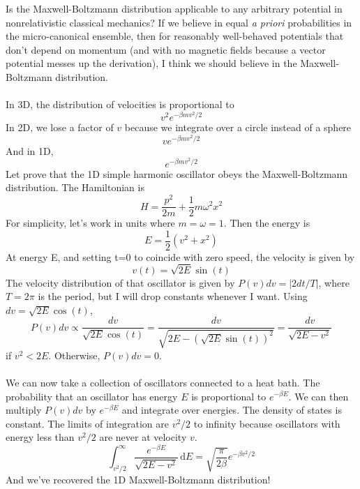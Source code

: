 \documentclass[a4paper,12pt]{article}
\begin{document}

Is the Maxwell-Boltzmann distribution applicable to any arbitrary potential in nonrelativistic classical mechanics?  If we believe in equal {\it a priori} probabilities in the micro-canonical ensemble, then for reasonably well-behaved potentials that don't depend on momentum (and with no magnetic fields because a vector potential messes up the derivation), I think we should believe in the Maxwell-Boltzmann distribution.
\\  \\
In 3D, the distribution of velocities is proportional to
\begin{equation}
v^2 e^{-\beta m v^2/2}
\end{equation}
In 2D, we lose a factor of $v$ because we integrate over a circle instead of a sphere\begin{equation}
v e^{-\beta m v^2/2}
\end{equation}
And in 1D,
\begin{equation}
e^{-\beta m v^2/2}
\end{equation}
Let prove that the 1D simple harmonic oscillator obeys the Maxwell-Boltzmann distribution.  The Hamiltonian is
\begin{equation}
H=\frac{p^2}{2m}+\frac{1}{2}m \omega^2 x^2
\end{equation}
For simplicity, let's work in units where $m=\omega=1$.  Then the energy is
\begin{equation}
E=\frac{1}{2} (v^2+x^2)
\end{equation}
At energy E, and setting t=0 to coincide with zero speed, the velocity is given by
\begin{equation}
v(t)=\sqrt{2E}\sin(t)
\end{equation}
The velocity distribution of that oscillator is given by $P(v)dv=|2 dt/T|$, where $T=2\pi$ is the period, but I will drop constants whenever I want.  Using $dv=\sqrt{2E}\cos(t)$,
\begin{equation}
P(v)dv \propto \frac{dv}{\sqrt{2E}\cos(t)}=\frac{dv}{\sqrt{2E-(\sqrt{2E}\sin(t))^2}}=\frac{dv}{\sqrt{2E-v^2}}
\end{equation}
if $v^2<2E$.  Otherwise, $P(v)dv=0$.\\ \\
We can now take a collection of oscillators connected to a heat bath.  The probability that an oscillator has energy $E$ is proportional to $e^{-\beta E}$.  We can then multiply $P(v)dv$ by $e^{-\beta E}$ and integrate over energies.  The density of states is constant.  The limits of integration are $v^2/2$ to infinity because oscillators with energy less than $v^2/2$ are never at velocity $v$.
\begin{equation}
\int_{v^2/2}^\infty \frac{e^{-\beta E}}{\sqrt{2E-v^2}}\,\mathrm{d}E = \sqrt{\frac{\pi}{2\beta}} e^{-\beta v^2/2}
\end{equation}
And we've recovered the 1D Maxwell-Boltzmann distribution!
\end{document}
